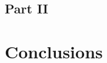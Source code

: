 \documentclass[pra,twocolumn,showpacs,amsmath,amssymb]{revtex4-1}
\begin{document}
%
%
%
%
%


%
%
%
%

\subsection{Part II}


\section{Conclusions} \label{sec:conclusion}

\begin{thebibliography}{1}

\end{thebibliography}
\end{document}
